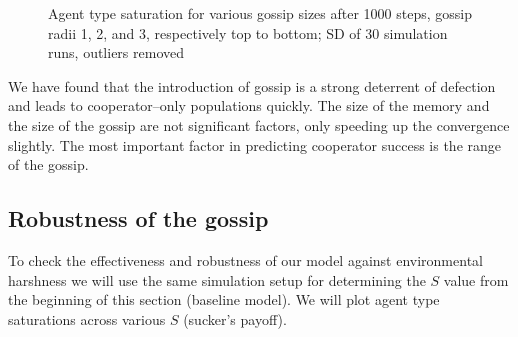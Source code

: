 \documentclass[english]{article}
\begin{document}
\begin{figure}[!h]
  \centering
  \caption{Agent type saturation for various gossip sizes after 1000 steps, gossip radii 1, 2, and 3, respectively top to bottom; SD of 30 simulation runs, outliers removed}
  \label{fig:agent_sat/gossip_size_step1000}
\end{figure}

We have found that the introduction of gossip is a strong deterrent of defection and leads to cooperator--only populations quickly.
The size of the memory and the size of the gossip are not significant factors, only speeding up the convergence slightly.
The most important factor in predicting cooperator success is the range of the gossip.


\subsection{Robustness of the gossip}
To check the effectiveness and robustness of our model against environmental harshness we will
use the same simulation setup for determining the $S$ value from the beginning of this section (baseline model).
We will plot agent type saturations across various $S$ (sucker's payoff).
\end{document}

